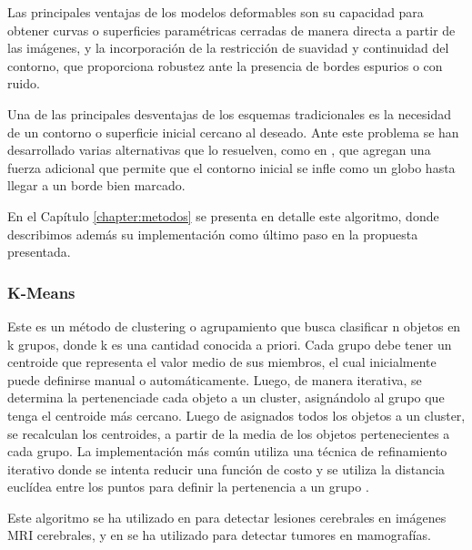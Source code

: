 Las principales ventajas de los modelos deformables son su capacidad para obtener curvas o superficies paramétricas cerradas de manera directa a partir de las imágenes, y la incorporación de la restricción de suavidad y continuidad del contorno, que proporciona robustez ante la presencia de bordes espurios o con ruido.

Una de las principales desventajas de los esquemas tradicionales es la necesidad de un contorno o superficie inicial cercano al deseado. Ante este problema se han desarrollado varias alternativas que lo resuelven, como en \citep{cohen1991active}, que agregan una fuerza adicional que permite que el contorno inicial se infle como un globo hasta llegar a un borde bien marcado.

En el Capítulo \ref{chapter:metodos} se presenta en detalle este algoritmo, donde describimos además su implementación como último paso en la propuesta presentada.

\subsubsection{K-Means}
Este es un método de clustering o agrupamiento que busca clasificar n objetos en k grupos, donde k es una cantidad conocida a priori. Cada grupo debe tener un centroide que representa el valor medio de sus miembros, el cual inicialmente puede definirse manual o automáticamente. Luego, de manera iterativa, se determina la pertenenciade cada objeto a un cluster, asignándolo al grupo que tenga el centroide más cercano. Luego de asignados todos los objetos a un cluster, se recalculan los centroides, a partir de la media de los objetos pertenecientes a cada grupo. La implementación más común utiliza una técnica de refinamiento iterativo donde se intenta reducir una función de costo y se utiliza la distancia euclídea entre los puntos para definir la pertenencia a un grupo \citep{macqueen1967some}.
 
Este algoritmo se ha utilizado en \citep{juang2010mri} para detectar lesiones cerebrales en imágenes MRI cerebrales, y en \citep{dalmiya2012application} se ha utilizado  para detectar tumores en mamografías.

